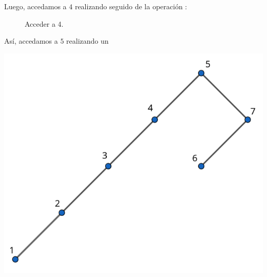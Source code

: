 Luego, accedamos a $4$ realizando  seguido de la operación :

\begin{center}
  \begin{figure}[h]
    \centering
    \caption*{Acceder a 4.}
    \label{f:animales}
  \end{figure}

\end{center}

Así, accedamos a $5$ realizando un 

\begin{center}
  \includegraphics[scale=0.3]{./07.png}
\end{center}

